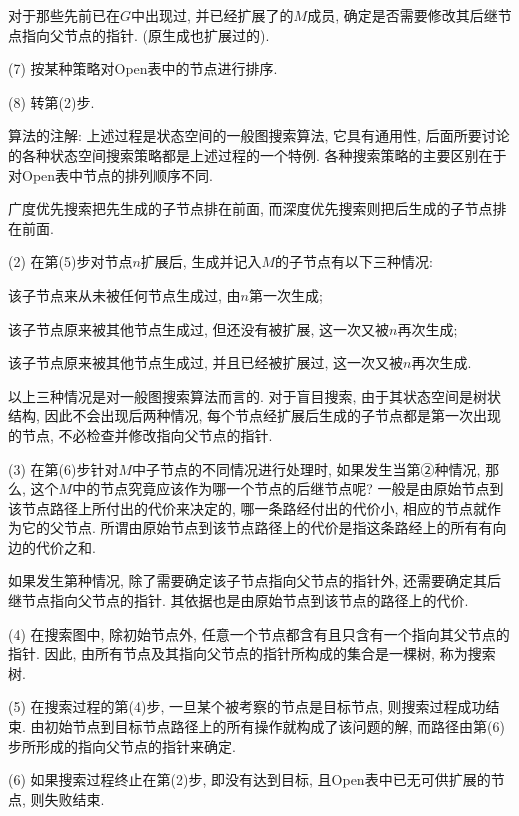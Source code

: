    \quad {} 对于那些先前已在$G$中出现过, 并已经扩展了的$M$成员, 确定是否需要修改其后继节点指向父节点的指针. (原生成也扩展过的).

(7) 按某种策略对Open表中的节点进行排序.

(8) 转第(2)步.
\begin{remark}
算法的注解: 上述过程是状态空间的一般图搜索算法, 它具有通用性, 后面所要讨论的各种状态空间搜索策略都是上述过程的一个特例. 各种搜索策略的主要区别在于对Open表中节点的排列顺序不同.
\begin{example}
  广度优先搜索把先生成的子节点排在前面, 而深度优先搜索则把后生成的子节点排在前面.
\end{example}

(2) 在第(5)步对节点$n$扩展后, 生成并记入$M$的子节点有以下三种情况:

    \quad {} 该子节点来从未被任何节点生成过, 由$n$第一次生成;

    \quad {} 该子节点原来被其他节点生成过, 但还没有被扩展, 这一次又被$n$再次生成;

    \quad {} 该子节点原来被其他节点生成过, 并且已经被扩展过, 这一次又被$n$再次生成.

以上三种情况是对一般图搜索算法而言的. 对于盲目搜索, 由于其状态空间是树状结构, 因此不会出现后两种情况, 每个节点经扩展后生成的子节点都是第一次出现的节点, 不必检查并修改指向父节点的指针.

(3) 在第(6)步针对$M$中子节点的不同情况进行处理时, 如果发生当第②种情况, 那么, 这个$M$中的节点究竟应该作为哪一个节点的后继节点呢? 
一般是由原始节点到该节点路径上所付出的代价来决定的, 哪一条路经付出的代价小, 相应的节点就作为它的父节点. 所谓由原始节点到该节点路径上的代价是指这条路经上的所有有向边的代价之和.

如果发生第种情况, 除了需要确定该子节点指向父节点的指针外, 还需要确定其后继节点指向父节点的指针. 其依据也是由原始节点到该节点的路径上的代价.

(4) 在搜索图中, 除初始节点外, 任意一个节点都含有且只含有一个指向其父节点的指针. 因此, 由所有节点及其指向父节点的指针所构成的集合是一棵树, 称为搜索树.

(5) 在搜索过程的第(4)步, 一旦某个被考察的节点是目标节点, 则搜索过程成功结束. 由初始节点到目标节点路径上的所有操作就构成了该问题的解, 而路径由第(6)步所形成的指向父节点的指针来确定.

(6) 如果搜索过程终止在第(2)步, 即没有达到目标, 且\textup{Open}表中已无可供扩展的节点, 则失败结束.
\end{remark}
